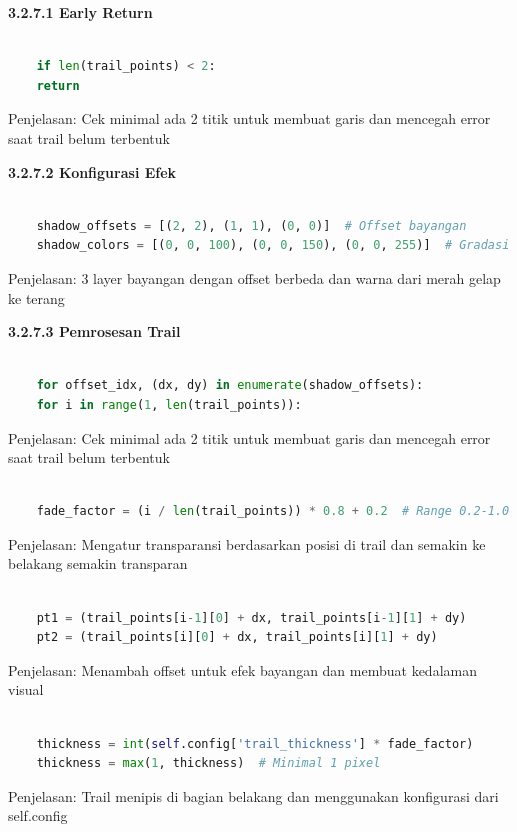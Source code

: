 \documentclass[11pt,a4paper]{article}
\begin{document}
    \noindent\textbf{3.2.7.1 Early Return}
    \begin{lstlisting}[language=Python, caption=Early Return]
        
    if len(trail_points) < 2:
    return
    \end{lstlisting}
    Penjelasan: Cek minimal ada 2 titik untuk membuat garis dan mencegah error saat trail belum terbentuk

    \noindent\textbf{3.2.7.2 Konfigurasi Efek}
    \begin{lstlisting}[language=Python, caption=Konfigurasi Efek]
        
    shadow_offsets = [(2, 2), (1, 1), (0, 0)]  # Offset bayangan
    shadow_colors = [(0, 0, 100), (0, 0, 150), (0, 0, 255)]  # Gradasi warna merah
    \end{lstlisting}
    Penjelasan: 3 layer bayangan dengan offset berbeda dan warna dari merah gelap ke terang

    \noindent\textbf{3.2.7.3 Pemrosesan Trail}
    \begin{lstlisting}[language=Python, caption=Untuk setiap layer bayangan]
        
    for offset_idx, (dx, dy) in enumerate(shadow_offsets):
    for i in range(1, len(trail_points)):
    \end{lstlisting}
    Penjelasan: Cek minimal ada 2 titik untuk membuat garis dan mencegah error saat trail belum terbentuk

    \begin{lstlisting}[language=Python, caption=Kalkulasi Fade]
        
    fade_factor = (i / len(trail_points)) * 0.8 + 0.2  # Range 0.2-1.0
    \end{lstlisting}
    Penjelasan: Mengatur transparansi berdasarkan posisi di trail dan semakin ke belakang semakin transparan

    \begin{lstlisting}[language=Python, caption=Posisi Trail dengan Offset]
        
    pt1 = (trail_points[i-1][0] + dx, trail_points[i-1][1] + dy)
    pt2 = (trail_points[i][0] + dx, trail_points[i][1] + dy)
    \end{lstlisting}
    Penjelasan: Menambah offset untuk efek bayangan dan membuat kedalaman visual
    
    \begin{lstlisting}[language=Python, caption=Ketebalan Trail]
    
    thickness = int(self.config['trail_thickness'] * fade_factor)
    thickness = max(1, thickness)  # Minimal 1 pixel
    \end{lstlisting}
    Penjelasan:
    Trail menipis di bagian belakang dan menggunakan konfigurasi dari self.config
\end{document}
